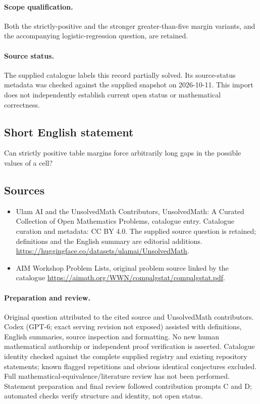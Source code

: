 \documentclass[11pt]{article}
\begin{document}
\paragraph{Scope qualification.}
Both the strictly-positive and the stronger greater-than-five margin variants, and the accompanying logistic-regression question, are retained.
\paragraph{Source status.}
The supplied catalogue labels this record partially solved. Its source-status metadata was checked against the supplied snapshot on 2026-10-11. This import does not independently establish current open status or mathematical correctness.
\subsection{Short English statement}
Can strictly positive table margins force arbitrarily long gaps in the possible values of a cell?
\subsection{Sources}
\begin{itemize}
\item[S1] Ulam AI and the UnsolvedMath Contributors, UnsolvedMath: A Curated Collection of Open Mathematics Problems, catalogue entry. Catalogue curation and metadata: CC BY 4.0. The supplied source question is retained; definitions and the English summary are editorial additions.
\url{https://huggingface.co/datasets/ulamai/UnsolvedMath}.
\item[S2] AIM Workshop Problem Lists, original problem source linked by the catalogue
\url{https://aimath.org/WWN/compalgstat/compalgstat.pdf}.
\end{itemize}
\paragraph{Preparation and review.}
Original question attributed to the cited source and UnsolvedMath contributors. Codex (GPT-6; exact serving revision not exposed) assisted with definitions, English summaries, source inspection and formatting. No new human mathematical authorship or independent proof verification is asserted. Catalogue identity checked against the complete supplied registry and existing repository statements; known flagged repetitions and obvious identical conjectures excluded. Full mathematical-equivalence/literature review has not been performed. Statement preparation and final review followed contribution prompts C and D; automated checks verify structure and identity, not open status.
\label{end:statement}
\end{document}

